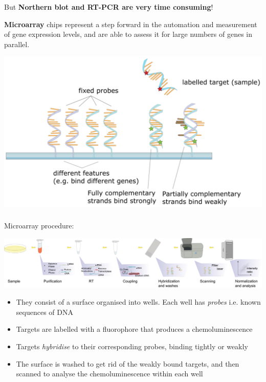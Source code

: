 \documentclass[x11names, svgnames]{beamer}
\begin{document}
\begin{frame}
  \frametitle{\three}
  But \textbf{Northern blot and RT-PCR are very time consuming}!\newline
  \newline
  \parbox{\linewidth}{\textbf{Microarray} chips represent a step forward in the automation and measurement of gene expression levels, and are able to assess it for large numbers of genes in parallel.}
  \begin{center}
    \includegraphics[scale=0.8]{images/wiki_hybridisation}
  \end{center}
\end{frame}

\begin{frame}
  \frametitle{\three}
  Microarray procedure:\newline
  \begin{center}
    \includegraphics[scale=0.15]{images/wiki_microarray}
  \end{center}
  \begin{itemize}
    \item They consist of a surface organised into wells. Each well has \textit{probes} i.e. known sequences of DNA
    \item Targets are labelled with a fluorophore that produces a chemoluminescence
    \item Targets \textit{hybridise} to their corresponding probes, binding tightly or weakly
    \item The surface is washed to get rid of the weakly bound targets, and then scanned to analyse the chemoluminescence within each well
  \end{itemize}
\end{frame}
\end{document}
